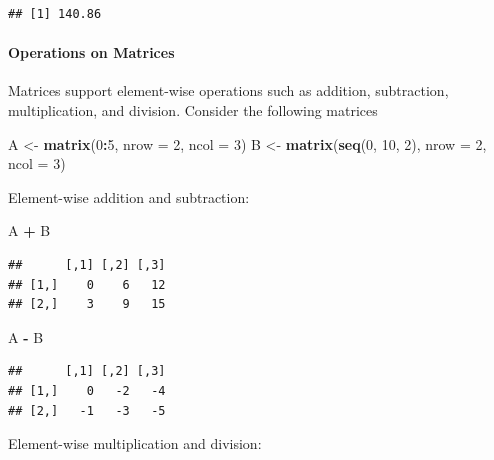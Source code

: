 \documentclass[
]{article}
\newenvironment{Shaded}{\begin{snugshade}}{\end{snugshade}}
\newcommand{\AttributeTok}[1]{\textcolor[rgb]{0.13,0.29,0.53}{#1}}
\newcommand{\DecValTok}[1]{\textcolor[rgb]{0.00,0.00,0.81}{#1}}
\newcommand{\FunctionTok}[1]{\textcolor[rgb]{0.13,0.29,0.53}{\textbf{#1}}}
\newcommand{\NormalTok}[1]{#1}
\newcommand{\OtherTok}[1]{\textcolor[rgb]{0.56,0.35,0.01}{#1}}
\newcommand{\SpecialCharTok}[1]{\textcolor[rgb]{0.81,0.36,0.00}{\textbf{#1}}}
\begin{document}
\begin{verbatim}
## [1] 140.86
\end{verbatim}

\hypertarget{operations-on-matrices}{%
\paragraph{Operations on Matrices}\label{operations-on-matrices}}

Matrices support element-wise operations such as addition, subtraction,
multiplication, and division. Consider the following matrices

\begin{Shaded}
\begin{Highlighting}[]
\NormalTok{A }\OtherTok{\textless{}{-}} \FunctionTok{matrix}\NormalTok{(}\DecValTok{0}\SpecialCharTok{:}\DecValTok{5}\NormalTok{, }\AttributeTok{nrow =} \DecValTok{2}\NormalTok{, }\AttributeTok{ncol =} \DecValTok{3}\NormalTok{)}
\NormalTok{B }\OtherTok{\textless{}{-}} \FunctionTok{matrix}\NormalTok{(}\FunctionTok{seq}\NormalTok{(}\DecValTok{0}\NormalTok{, }\DecValTok{10}\NormalTok{, }\DecValTok{2}\NormalTok{), }\AttributeTok{nrow =} \DecValTok{2}\NormalTok{, }\AttributeTok{ncol =} \DecValTok{3}\NormalTok{)}
\end{Highlighting}
\end{Shaded}

Element-wise addition and subtraction:

\begin{Shaded}
\begin{Highlighting}[]
\NormalTok{A }\SpecialCharTok{+}\NormalTok{ B}
\end{Highlighting}
\end{Shaded}

\begin{verbatim}
##      [,1] [,2] [,3]
## [1,]    0    6   12
## [2,]    3    9   15
\end{verbatim}

\begin{Shaded}
\begin{Highlighting}[]
\NormalTok{A }\SpecialCharTok{{-}}\NormalTok{ B}
\end{Highlighting}
\end{Shaded}

\begin{verbatim}
##      [,1] [,2] [,3]
## [1,]    0   -2   -4
## [2,]   -1   -3   -5
\end{verbatim}

Element-wise multiplication and division:
\end{document}

